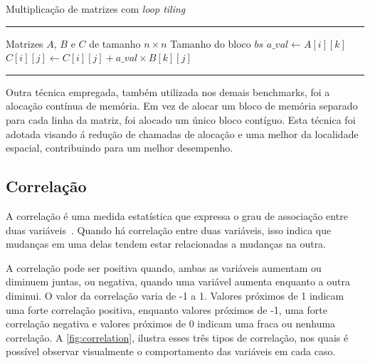 \begin{algorithm}[htb]
	\caption{Multiplicação de matrizes com \textit{loop tiling}}
	\label{alg:tiling}
	\hrule
	\begin{algorithmic}[1]
		\REQUIRE Matrizes $A$, $B$ e $C$ de tamanho $n \times n$
		\REQUIRE Tamanho do bloco $bs$
		\STATE $a\_val \gets A[i][k]$
		\STATE $C[i][j] \gets C[i][j] + a\_val \times B[k][j]$
		\ENDFOR
		\ENDFOR
		\ENDFOR
		\ENDFOR
		\ENDFOR
	\end{algorithmic}
	\hrule
	\fonte{}
\end{algorithm}

Outra técnica empregada, também utilizada nos demais benchmarks, foi a alocação contínua de memória. Em vez de alocar um bloco de memória separado para cada linha da matriz, foi alocado um único bloco contíguo. Esta técnica foi adotada visando á redução de chamadas de alocação e uma melhor da localidade espacial, contribuindo para um melhor desempenho.

\subsection{Correlação}\label{subsec:correlation}

A correlação é uma medida estatística que expressa o grau de associação entre duas variáveis~\cite{morettin2010}. Quando há correlação entre duas variáveis, isso indica que mudanças em uma delas tendem estar relacionadas a mudanças na outra.

A correlação pode ser positiva quando, ambas as variáveis aumentam ou diminuem juntas, ou negativa, quando uma variável aumenta enquanto a outra diminui. O valor da correlação varia de -1 a 1. Valores próximos de 1 indicam uma forte correlação positiva, enquanto valores próximos de -1, uma forte correlação negativa e valores próximos de 0 indicam uma fraca ou nenhuma correlação. A \autoref{fig:correlation}, ilustra esses três tipos de correlação, nos quais é possível observar visualmente o comportamento das variáveis em cada caso.

